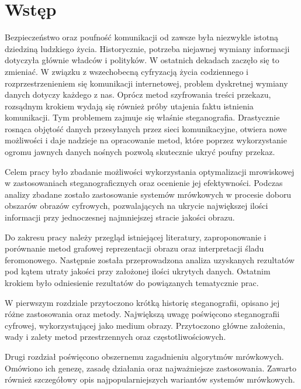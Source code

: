 
\chapter*{Wstęp}\label{chap:intro}
{
    Bezpieczeństwo oraz poufność komunikacji od zawsze była niezwykle istotną dziedziną ludzkiego życia. Historycznie,
    potrzeba niejawnej wymiany informacji dotyczyła głównie władców i polityków. W ostatnich dekadach zaczęło się to
    zmieniać. W związku z wszechobecną cyfryzacją życia codziennego i rozprzestrzenieniem się komunikacji internetowej,
    problem dyskretnej wymiany danych dotyczy każdego z nas. Oprócz metod szyfrowania treści przekazu, rozsądnym krokiem
    wydają się również próby utajenia faktu istnienia komunikacji. Tym problemem zajmuje się właśnie steganografia.
    Drastycznie rosnąca objętość danych przesyłanych przez sieci komunikacyjne, otwiera nowe możliwości i daje nadzieje
    na opracowanie metod, które poprzez wykorzystanie ogromu jawnych danych nośnych pozwolą skutecznie ukryć poufny
    przekaz.

    Celem pracy było zbadanie możliwości wykorzystania optymalizacji mrowiskowej w zastosowaniach steganograficznych
    oraz ocenienie jej efektywności. Podczas analizy zbadane zostało zastosowanie systemów mrówkowych w procesie doboru
    obszarów obrazów cyfrowych, pozwalających na ukrycie największej ilości informacji przy jednoczesnej najmniejszej
    stracie jakości obrazu.

    Do zakresu pracy należy przegląd istniejącej literatury, zaproponowanie i porównanie metod grafowej reprezentacji
    obrazu oraz interpretacji śladu feromonowego. Następnie została przeprowadzona analiza uzyskanych rezultatów pod
    kątem utraty jakości przy założonej ilości ukrytych danych. Ostatnim krokiem było odniesienie rezultatów do
    powiązanych tematycznie prac.

    W pierwszym rozdziale przytoczono krótką historię steganografii, opisano jej różne zastosowania oraz metody.
    Największą uwagę poświęcono steganografii cyfrowej, wykorzystującej jako medium obrazy. Przytoczono główne
    założenia, wady i zalety metod przestrzennych oraz częstotliwościowych.

    Drugi rozdział poświęcono obszernemu zagadnieniu algorytmów mrówkowych. Omówiono ich genezę, zasadę działania oraz
    najważniejsze zastosowania. Zawarto również szczegółowy opis najpopularniejszych wariantów systemów mrówkowych.

}
